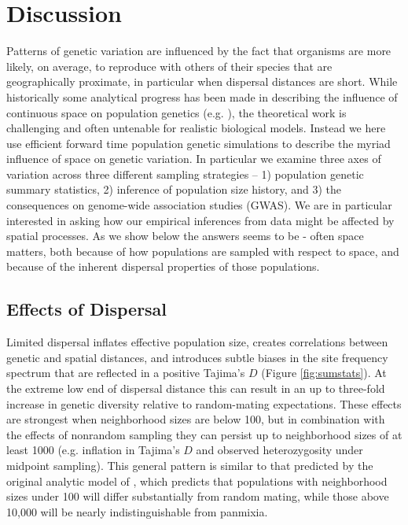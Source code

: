 \documentclass[11pt,twoside,lineno]{preprint}
\begin{document}
\section{Discussion}
Patterns of genetic variation are influenced by the fact that organisms are more likely, on average, to reproduce with others of their species that are geographically proximate, in particular when dispersal distances are short. While historically some analytical progress has been made in describing the influence of continuous space on population genetics (e.g. \cite{Wright1943,Rousset1997,Ringbauer2017,Barton2010}), the theoretical work is challenging and often untenable for realistic biological models. Instead we here use efficient forward time population genetic simulations to describe the myriad influence of space on genetic variation. In particular we examine three axes of variation across three different sampling strategies -- 1) population genetic summary statistics, 2) inference of population size history, and 3) the consequences on genome-wide association studies (GWAS). We are in particular interested in asking how our empirical inferences from data might be affected by spatial processes. As we show below the answers seems to be - often space matters, both because of how populations are sampled with respect to space, and because of the inherent dispersal properties of those populations. 

\subsection{Effects of Dispersal}
Limited dispersal inflates effective population size, creates correlations between genetic and spatial distances, and introduces subtle biases in the site frequency spectrum that are reflected in a positive Tajima's $D$ (Figure \ref{fig:sumstats}). At the extreme low end of dispersal distance this can result in an up to three-fold increase in genetic diversity relative to random-mating expectations. These effects are strongest when neighborhood sizes are below 100, but in combination with the effects of nonrandom sampling they can persist up to neighborhood sizes of at least 1000 (e.g. inflation in Tajima's $D$ and observed heterozygosity under midpoint sampling). This general pattern is similar to that predicted by the original analytic model of \cite{Wright1943}, which predicts that populations with neighborhood sizes under 100 will differ substantially from random mating, while those above 10,000 will be nearly indistinguishable from panmixia. 
\end{document}
